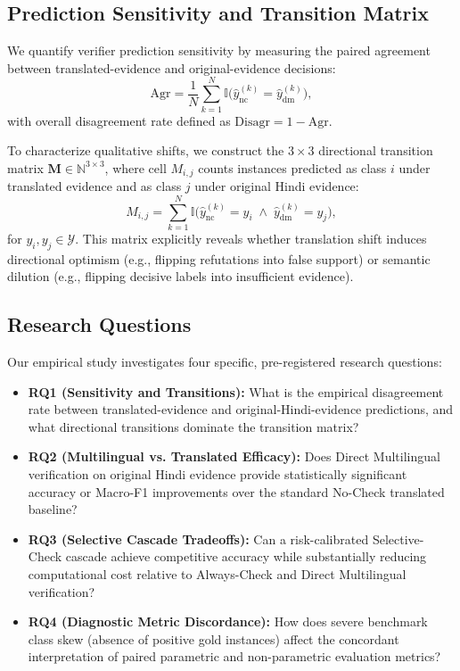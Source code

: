\subsection{Prediction Sensitivity and Transition Matrix}
We quantify verifier prediction sensitivity by measuring the paired agreement between translated-evidence and original-evidence decisions:
\begin{equation}
    \text{Agr} = \frac{1}{N} \sum_{k=1}^N \mathbb{I}\big(\hat{y}_{\text{nc}}^{(k)} = \hat{y}_{\text{dm}}^{(k)}\big),
\end{equation}
with overall disagreement rate defined as $\text{Disagr} = 1 - \text{Agr}$.

To characterize qualitative shifts, we construct the $3 \times 3$ directional transition matrix $\mathbf{M} \in \mathbb{N}^{3 \times 3}$, where cell $M_{i,j}$ counts instances predicted as class $i$ under translated evidence and as class $j$ under original Hindi evidence:
\begin{equation}
    M_{i,j} = \sum_{k=1}^N \mathbb{I}\big(\hat{y}_{\text{nc}}^{(k)} = y_i \;\land\; \hat{y}_{\text{dm}}^{(k)} = y_j\big),
\end{equation}
for $y_i, y_j \in \mathcal{Y}$. This matrix explicitly reveals whether translation shift induces directional optimism (e.g., flipping refutations into false support) or semantic dilution (e.g., flipping decisive labels into insufficient evidence).

\subsection{Research Questions}
Our empirical study investigates four specific, pre-registered research questions:
\begin{itemize}
    \item \textbf{RQ1 (Sensitivity and Transitions):} What is the empirical disagreement rate between translated-evidence and original-Hindi-evidence predictions, and what directional transitions dominate the transition matrix?
    \item \textbf{RQ2 (Multilingual vs. Translated Efficacy):} Does Direct Multilingual verification on original Hindi evidence provide statistically significant accuracy or Macro-F1 improvements over the standard No-Check translated baseline?
    \item \textbf{RQ3 (Selective Cascade Tradeoffs):} Can a risk-calibrated Selective-Check cascade achieve competitive accuracy while substantially reducing computational cost relative to Always-Check and Direct Multilingual verification?
    \item \textbf{RQ4 (Diagnostic Metric Discordance):} How does severe benchmark class skew (absence of positive gold instances) affect the concordant interpretation of paired parametric and non-parametric evaluation metrics?
\end{itemize}
